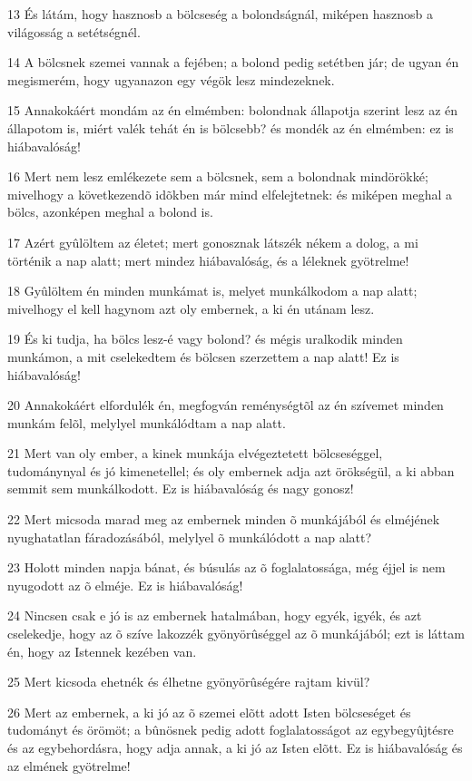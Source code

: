 \par 13 És látám, hogy hasznosb a bölcseség a bolondságnál, miképen hasznosb a világosság a setétségnél.
\par 14 A bölcsnek szemei vannak a fejében; a bolond pedig setétben jár; de ugyan én megismerém, hogy ugyanazon egy végök lesz mindezeknek.
\par 15 Annakokáért mondám az én elmémben: bolondnak állapotja szerint lesz az én állapotom is, miért valék tehát én is bölcsebb? és mondék az én elmémben: ez is hiábavalóság!
\par 16 Mert nem lesz emlékezete sem a bölcsnek, sem a bolondnak mindörökké; mivelhogy a következendõ idõkben már mind elfelejtetnek: és miképen meghal a bölcs, azonképen meghal a bolond is.
\par 17 Azért gyûlöltem az életet; mert gonosznak látszék nékem a dolog, a mi történik a nap alatt; mert mindez hiábavalóság, és a léleknek gyötrelme!
\par 18 Gyûlöltem én minden munkámat is, melyet munkálkodom a nap alatt; mivelhogy el kell hagynom azt oly embernek, a ki én utánam lesz.
\par 19 És ki tudja, ha bölcs lesz-é vagy bolond? és mégis uralkodik minden munkámon, a mit cselekedtem és bölcsen szerzettem a nap alatt! Ez is hiábavalóság!
\par 20 Annakokáért elfordulék én, megfogván reménységtõl az én szívemet minden munkám felõl, melylyel munkálódtam a nap alatt.
\par 21 Mert van oly ember, a kinek munkája elvégeztetett bölcseséggel, tudománynyal és jó kimenetellel; és oly embernek adja azt örökségül, a ki abban semmit sem munkálkodott. Ez is hiábavalóság és nagy gonosz!
\par 22 Mert micsoda marad meg az embernek minden õ munkájából és elméjének nyughatatlan fáradozásából, melylyel õ munkálódott a nap alatt?
\par 23 Holott minden napja bánat, és búsulás az õ foglalatossága, még éjjel is nem nyugodott az õ elméje. Ez is hiábavalóság!
\par 24 Nincsen csak e jó is az embernek hatalmában, hogy egyék, igyék, és azt cselekedje, hogy az õ szíve lakozzék gyönyörûséggel az õ munkájából; ezt is láttam én, hogy az Istennek kezében van.
\par 25 Mert kicsoda ehetnék és élhetne gyönyörûségére rajtam kivül?
\par 26 Mert az embernek, a ki jó az õ szemei elõtt adott Isten bölcseséget és tudományt és örömöt; a bûnösnek pedig adott foglalatosságot az egybegyûjtésre és az egybehordásra, hogy adja annak, a ki jó az Isten elõtt. Ez is hiábavalóság és az elmének gyötrelme!

